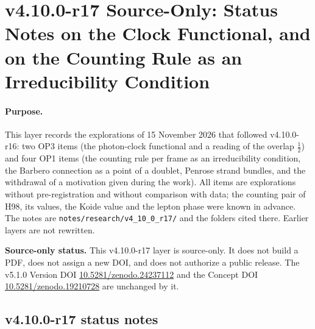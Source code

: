 
\clearpage
\section*{v4.10.0-r17 Source-Only: Status Notes on the Clock Functional, and on the Counting Rule as an Irreducibility Condition}
\label{sec:v4100-r17-clock-irreducibility}

\paragraph{Purpose.}
This layer records the explorations of 15 November 2026 that followed v4.10.0-r16: two OP3 items (the photon-clock functional
and a reading of the overlap \(\tfrac12\)) and four OP1 items (the counting rule per frame as an irreducibility condition, the
Barbero connection as a point of a doublet, Penrose strand bundles, and the withdrawal of a motivation given during the
work).  All items are explorations without pre-registration and without comparison with data; the counting pair of H98, its
values, the Koide value and the lepton phase were known in advance.  The notes are
\texttt{notes/\allowbreak research/\allowbreak v4\_10\_0\_r17/} and the folders cited there.  Earlier layers are not
rewritten.

\noindent\textbf{Source-only status.}
This v4.10.0-r17 layer is source-only.  It does not build a PDF, does not assign a new DOI,
and does not authorize a public release.  The v5.1.0 Version DOI
\href{https://doi.org/10.5281/zenodo.24237112}{10.5281/zenodo.24237112} and the Concept DOI
\href{https://doi.org/10.5281/zenodo.19210728}{10.5281/zenodo.19210728} are unchanged by it.

\subsection*{v4.10.0-r17 status notes}
\label{subsec:v4100-r17-status}

